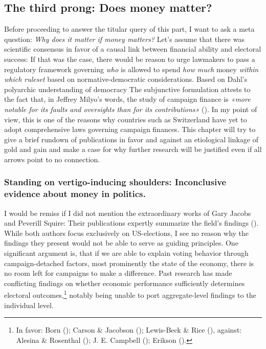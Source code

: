 \documentclass[11pt,a4paper]{article}
\begin{document}
\subsection{The third prong: Does money matter?}
Before proceeding to answer the titular query of this part, I want to ask a meta question: \textit{Why does it matter if money matters?} Let’s assume that there was scientific consensus in favor of a causal link between financial ability and electoral success: If that was the case, there would be reason to urge lawmakers to pass a regulatory framework governing \textit{who} is allowed to spend \textit{how much} money \textit{within which ruleset} based on normative-democratic considerations. Based on Dahl's polyarchic understanding of democracy The subjunctive formulation attests to the fact that, in Jeffrey Milyo’s words, the study of campaign finance is \textit{«more notable for its faults and oversights than for its contributions»} (\cite{milyo_political_1999}). In my point of view, this is one of the reasons why countries such as Switzerland have yet to adopt comprehensive laws governing campaign finances. This chapter will try to give a brief rundown of publications in favor and against an etiological linkage of gold and gain and make a case for why further research will be justified even if all arrows point to no connection.

\subsubsection{Standing on vertigo-inducing shoulders: Inconclusive evidence about money in politics.}
I would be remiss if I did not mention the extraordinary works of Gary Jacobs and Peverill Squire: Their publications expertly summarize the field’s findings (\cite{jacobson_money_1985,squire_candidates_1995}). While both authors focus exclusively on US-elections, I see no reason why the findings they present would not be able to serve as guiding principles. One significant argument is, that if we are able to explain voting behavior through campaign-detached factors, most prominently the state of the economy, there is no room left for campaigns to make a difference. Past research has made conflicting findings on whether economic performance sufficiently determines electoral outcomes,\footnote{In favor: Born (\citeyear{born_strategic_1986}); Carson \& Jacobson (\citeyear{carson_politics_2024}); Lewis-Beck \& Rice (\citeyear{lewis-beck_forecasting_1992}), against: Alesina \& Rosenthal (\citeyear{alesina_partisan_1989}); J. E. Campbell (\citeyear{campbell_presidential_1997}); Erikson (\citeyear{erikson_economic_1990}).} notably being unable to port aggregate-level findings to the individual level.
\end{document}
